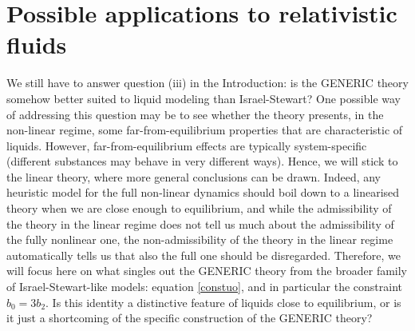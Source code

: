 \documentclass[a4paper, amsfonts, amssymb, amsmath, reprint, showkeys, nofootinbib, twoside, onecolumn, notitlepage]{revtex4-1}
\theoremstyle{definition}
\theoremstyle{theorem}
\begin{document}
\section{Possible applications to relativistic fluids}
\label{sec:new}

We still have to answer question (iii) in the Introduction: is the GENERIC theory somehow better suited to liquid modeling than Israel-Stewart? One possible way of addressing this question may be to see whether the theory presents, in the non-linear regime, some far-from-equilibrium properties that are characteristic of liquids. 
However, far-from-equilibrium effects are typically system-specific (different substances may behave in very different ways). Hence, we will stick to the linear theory, where more general conclusions can be drawn.
%
Indeed, any heuristic model for the full non-linear dynamics should boil down to a linearised theory when we are close enough to equilibrium, and while the admissibility of the theory in the linear regime does not tell us much about the admissibility of the fully nonlinear one, the non-admissibility of the theory in the linear regime automatically tells us that also the full one should be disregarded.
Therefore, we will focus here on what singles out the GENERIC theory from the broader family of Israel-Stewart-like models: equation \eqref{constuo}, and in particular the constraint $b_0=3b_2$. 
Is this identity a distinctive feature of liquids close to equilibrium, or is it just a shortcoming of the specific construction of the GENERIC theory? 
\end{document}
